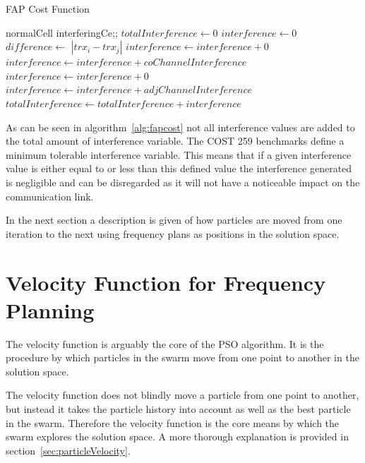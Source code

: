 \begin{algorithm}
\caption{FAP Cost Function}
\label{alg:fapcost}
	\begin{algorithmic}[1]
	\Require normalCell
	\Require interferingCe;;
	\State $totalInterference \leftarrow $0
			\State $interference \leftarrow 0$
			\State $difference \leftarrow$ $|trx_i - trx_j|$
					\State $interference \leftarrow interference + 0$
				\Else
					\State $interference \leftarrow interference + coChannelInterference$
				\EndIf
			\Else
						\State $interference \leftarrow interference + 0$
					\Else
						\State $interference \leftarrow interference + adjChannelInterference$
					\EndIf
				\EndIf
			\EndIf
			\State $totalInterference \leftarrow totalInterference + interference$
		\EndFor
	\EndFor
	\end{algorithmic}
\end{algorithm}

As can be seen in algorithm~\ref{alg:fapcost} not all interference values are added to the total amount of interference variable. The COST 259 benchmarks define a minimum tolerable interference variable. This means that if a given interference value is either equal to or less than this defined value the interference generated is negligible and can be disregarded as it will not have a noticeable impact on the communication link.

In the next section a description is given of how particles are moved from one iteration to the next using frequency plans as positions in the solution space.
\section{Velocity Function for Frequency Planning}
\label{sec:velocityFAP}
The velocity function is arguably the core of the \gls{PSO} algorithm. It is the procedure by which particles in the swarm move from one point to another in the solution space. 

The velocity function does not blindly move a particle from one point to another, but instead it takes the particle history into account as well as the best particle in the swarm. Therefore the velocity function is the core means by which the swarm explores the solution space. A more thorough explanation is provided in section~\ref{sec:particleVelocity}.

